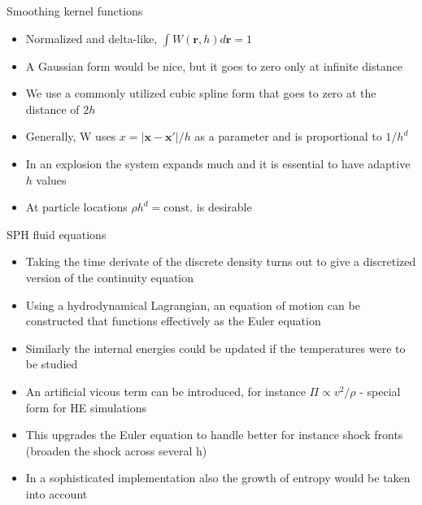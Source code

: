 \documentclass{beamer}
\begin{document}
\begin{frame}{Smoothing kernel functions}
\begin{itemize}

\item Normalized and delta-like, $\int W(\mathbf{r},h) d\mathbf{r} = 1$
\item A Gaussian form would be nice, but it goes to zero only at infinite distance
\item We use a commonly utilized cubic spline form that goes to zero at the distance of $2h$
\item Generally, W uses $x = |\mathbf{x} - \mathbf{x}'|/h$ as a parameter and is proportional to $1/h^d$
\item In an explosion the system expands much and it is essential to have adaptive $h$ values
\item At particle locations $\rho h^d = \text{const.}$ is desirable

\end{itemize}
\end{frame}

\begin{frame}{SPH fluid equations}
\begin{itemize}

\item Taking the time derivate of the discrete density turns out to give a discretized version of the
continuity equation
\item Using a hydrodynamical Lagrangian, an equation of motion can be constructed that functions effectively
as the Euler equation
\item Similarly the internal energies could be updated if the temperatures were to be studied
\item An artificial vicous term can be introduced, for instance $\Pi \propto v^2/\rho$ - special form for HE simulations
\item This upgrades the Euler equation to handle better for instance shock fronts (broaden the shock across several h)
\item In a sophisticated implementation also the growth of entropy would be taken into account

\end{itemize}
\end{frame}
\end{document}
